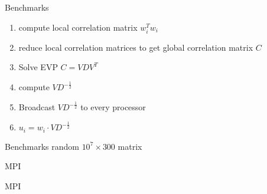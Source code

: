 \begin{frame}{Benchmarks}
	\Large{}
	\normalsize

	\begin{minipage}[t]{0.3\textwidth}
		\scalebox{0.75}{
			
		}
	\end{minipage}
	\begin{minipage}[t]{0.6\textwidth}\vspace{-60mm}
		\begin{enumerate}
			\item compute local correlation matrix $w_i^Tw_i$
			\item reduce local correlation matrices to get global correlation matrix $C$
			\item Solve EVP $C=V D V^T$
			\item compute $VD^{-\frac{1}{2}}$
			\item Broadcast $VD^{-\frac{1}{2}}$ to every processor
			\item $	u_i = w_i \cdot VD^{-\frac{1}{2}}$
		\end{enumerate}
	\end{minipage}
	
\end{frame}

\begin{frame}{Benchmarks}
	\Large{}
	\normalsize random $10^7 \times 300 $ matrix
	
	\centering
	\scalebox{0.75}{
		
	}	
\end{frame}

\begin{frame}{MPI}
	\Large{}
	\normalsize
	
	\centering
	\vspace{1cm}
	
	
\end{frame}

\begin{frame}{MPI}
	\Large{}
	\normalsize
	
	\centering
	\vspace{1cm}
	
	
\end{frame}

